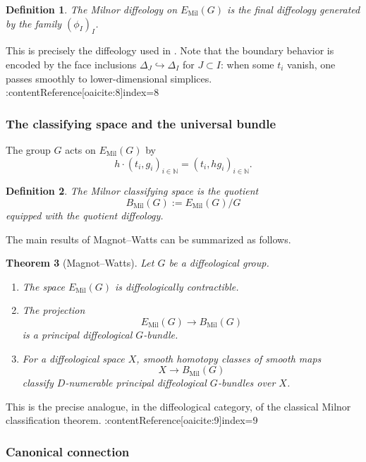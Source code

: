 \documentclass[11pt]{amsart}
\newtheorem{theorem}{Theorem}[section]
\newtheorem{definition}[theorem]{Definition}
\begin{document}
\begin{definition}
The \emph{Milnor diffeology} on \(E_{\mathrm{Mil}}(G)\) is the final diffeology generated by the family \((\phi_I)_I\).
\end{definition}

This is precisely the diffeology used in \cite{MagnotWatts2017}. Note that the boundary behavior is encoded by the face inclusions \(\Delta_J\hookrightarrow \Delta_I\) for \(J\subset I\): when some \(t_i\) vanish, one passes smoothly to lower-dimensional simplices. :contentReference[oaicite:8]{index=8}

\subsubsection{The classifying space and the universal bundle}

The group \(G\) acts on \(E_{\mathrm{Mil}}(G)\) by
\[
h\cdot (t_i,g_i)_{i\in\mathbb N}=(t_i,hg_i)_{i\in\mathbb N}.
\]

\begin{definition}
The \emph{Milnor classifying space} is the quotient
\[
B_{\mathrm{Mil}}(G):=E_{\mathrm{Mil}}(G)/G
\]
equipped with the quotient diffeology.
\end{definition}

The main results of Magnot--Watts can be summarized as follows.

\begin{theorem}[Magnot--Watts]\label{thm:MW}
Let \(G\) be a diffeological group.
\begin{enumerate}
\item The space \(E_{\mathrm{Mil}}(G)\) is diffeologically contractible.
\item The projection
\[
E_{\mathrm{Mil}}(G)\to B_{\mathrm{Mil}}(G)
\]
is a principal diffeological \(G\)-bundle.
\item For a diffeological space \(X\), smooth homotopy classes of smooth maps
\[
X\to B_{\mathrm{Mil}}(G)
\]
classify \(D\)-numerable principal diffeological \(G\)-bundles over \(X\).
\end{enumerate}
\end{theorem}

This is the precise analogue, in the diffeological category, of the classical Milnor classification theorem. :contentReference[oaicite:9]{index=9}

\subsubsection{Canonical connection}
\end{document}
